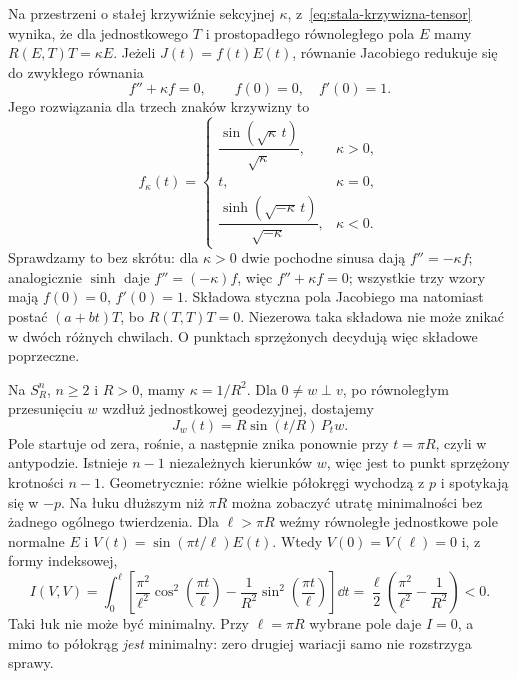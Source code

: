 Na przestrzeni o stałej krzywiźnie sekcyjnej
$\kappa$, z~\eqref{eq:stala-krzywizna-tensor} wynika,
że dla jednostkowego $T$ i prostopadłego
równoległego pola $E$ mamy
$R(E,T)T=\kappa E$.
Jeżeli $J(t)=f(t)E(t)$, równanie Jacobiego
redukuje się do zwykłego równania
\begin{equation}\label{eq:jacobi-stala-krzywizna}
 f''+\kappa f=0,
 \qquad f(0)=0,\quad f'(0)=1.
\end{equation}
Jego rozwiązania dla trzech znaków krzywizny to
\begin{equation}\label{eq:jacobi-trzy-krzywizny}
 f_\kappa(t)=
 \begin{cases}
  \dfrac{\sin(\sqrt\kappa\,t)}{\sqrt\kappa},
       &\kappa>0,\\[5pt]
  t,&\kappa=0,\\[3pt]
  \dfrac{\sinh(\sqrt{-\kappa}\,t)}{\sqrt{-\kappa}},
       &\kappa<0.
 \end{cases}
\end{equation}
Sprawdzamy to bez skrótu: dla $\kappa>0$
dwie pochodne sinusa dają $f''=-\kappa f$;
analogicznie $\sinh$ daje $f''=(-\kappa)f$,
więc $f''+\kappa f=0$; wszystkie trzy wzory
mają $f(0)=0$, $f'(0)=1$.
Składowa styczna pola Jacobiego ma natomiast
postać $(a+bt)T$, bo $R(T,T)T=0$.
Niezerowa taka składowa nie może znikać
w dwóch różnych chwilach. O punktach
sprzężonych decydują więc składowe poprzeczne.

\begin{przyklad}
\label{prz:jacobi-sfera}
Na $S_R^n$, $n\geq2$ i $R>0$, mamy $\kappa=1/R^2$.
Dla $0\ne w\perp v$, po równoległym przesunięciu
$w$ wzdłuż jednostkowej geodezyjnej, dostajemy
\[
 J_w(t)=R\sin(t/R)\,P_t w.
\]
Pole startuje od zera, rośnie, a następnie
znika ponownie przy $t=\pi R$, czyli w antypodzie.
Istnieje $n-1$ niezależnych kierunków $w$,
więc jest to punkt sprzężony krotności $n-1$.
Geometrycznie: różne wielkie półokręgi
wychodzą z $p$ i spotykają się w $-p$.
Na łuku dłuższym niż $\pi R$ można zobaczyć
utratę minimalności bez żadnego ogólnego
twierdzenia. Dla $\ell>\pi R$ weźmy
równoległe jednostkowe pole normalne $E$
i $V(t)=\sin(\pi t/\ell)E(t)$.
Wtedy $V(0)=V(\ell)=0$ i, z formy indeksowej,
\begin{equation}\label{eq:jacobi-sfera-indeks}
 I(V,V)
 =\int_0^\ell\left[\frac{\pi^2}{\ell^2}
                   \cos^2\!\left(\frac{\pi t}{\ell}\right)
       -\frac1{R^2}\sin^2\!\left(\frac{\pi t}{\ell}\right)
                    \right]\dd t
 =\frac\ell2\left(\frac{\pi^2}{\ell^2}
                     -\frac1{R^2}\right)<0.
\end{equation}
Taki łuk nie może być minimalny.
Przy $\ell=\pi R$ wybrane pole daje $I=0$,
a mimo to półokrąg \emph{jest} minimalny:
zero drugiej wariacji samo nie rozstrzyga sprawy.
\end{przyklad}

